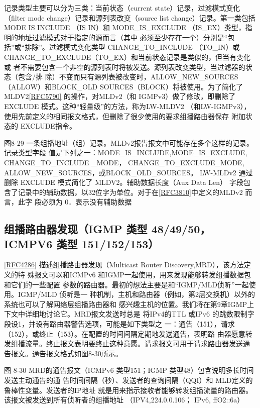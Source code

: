 记录类型主要可以分为三类：当前状态（current state）记录，过滤模式变化（filter mode
change）记录和源列表改变（source list change）记录。第一类包括 MODE IS INCLUDE （IS
IN）和 MODE\_IS\_EXCLUDE （IS\_EX）类型，指明的地址过滤模式对于指定的源而言（其中
必须至少存在一个）分别是“包括”或“排除”。过滤模式变化类型 CHANGE\_TO\_INCLUDE
（TO\_IN）或CHANGE\_TO\_EXCLUDE（TO\_EX）和当前状态记录是类似的，但当有变化或
者不需要包含一个非空的源列表时将被发送。源列表改变类型，当过滤器的状态（包含/排
除）不变而只有源列表被改变时，ALLOW\_NEW\_SOURCES（ALLOW）和BLOCK\_OLD
SOURCES（BLOCK）将被使用。为了简化了MLDV2\href{https://www.rfc-editor.org/rfc/rfc5790}{[RFC5790]}
的操作，对MLDv2（和
IGMPv3）做了修改，即删除了 EXCLUDE 模式。这种“轻量级”的方法，称为LW-MLDV2
（和LW-IGMPv3），使用先前定义的相同报文格式，但删除了很少使用的要求组播路由器保存
附加状态的 EXCLUDE指令。

图8-29 一条组播地址（组）记录。MLDv2报告报文中可能存在多个这样的记录。记录类型字段
值是下列之一：MODE\_IS\_INCLUDE,MODE\_IS\_EXCLUDE, CHANGE\_TO\_INCLUDE \_MODE，
CHANGE\_TO\_EXCLUDE\_MODE, ALLOW\_NEW\_SOURCES，或BLOCK\_OLD\_SOURCES。
LW-MLDv2 通过删除 EXCLUDE 模式简化了 MLDV2。辅助数据长度（Aux Data Len） 字段包
含了记录中的辅助数据，以32位字为单位。对于在\href{https://www.rfc-editor.org/rfc/rfc3810}{[RFC3810]}中定义的MLDv2
而言，此字
段必须为 0．表示没有辅助数据

\subsection{组播路由器发现（IGMP 类型 48/49/50，ICMPV6 类型 151/152/153）}
\href{https://www.rfc-editor.org/rfc/rfc4286}{[RFC4286]}
描述组播路由器发现（Multicast Router Discovery,MRD），该方法定义的特
殊报文可以和ICMPv6 和IGMP一起使用，用来发现能够转发组播数据包和它们的一些配置
参数的路由器。最初的想法主要是和“IGMP/MLD侦听”一起使用。IGMP/MLD 侦听是一
种机制，主机和路由器（例如，第2层交换机）以外的系统也可以了解网络层组播路由器和
感兴趣主机的位置。我们将在第9章IGMP上下文中详细地讨论它。MRD报文发送时总是
将IPv4的TTL 或IPv6 的跳数限制字段设1，并设有路由器警告选项，可能是如下类型之
一：通告（151），请求（152），或终止（153）。在配置的时间间隔定期地发送通告，表明路
由器愿意转发组播流量。终止报文表明要终止这种意愿。请求报文可用于请求路由器发送通
告报文。通告报文格式如图8-30所示。

图 8-30 MRD的通告报文（ICMPv6 类型151；IGMP 类型48）包含说明多长时间发送主动通告的通
告时间间隔（秒）、发送者的查询间隔（QQI）和 MLD定义的鲁棒性变量。发送者的IP地址
就是用来指示接收者能够转发组播流量的路由器。该报文被发送到所有侦听者的组播地址
（IPV4,224.0.0.106； IPv6, ffO2::6a）

